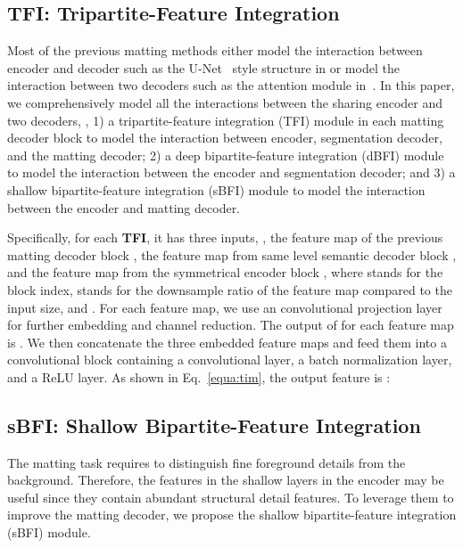 \documentclass[sigconf]{acmart}
\begin{document}
\subsection{TFI: Tripartite-Feature Integration}
\label{sec:tim}
Most of the previous matting methods either model the interaction between encoder and decoder such as the U-Net~\cite{unet} style structure in \cite{gfm} or model the interaction between two decoders such as the attention module in~\cite{hatt}. In this paper, we comprehensively model all the interactions between the sharing encoder and two decoders, , 1) a tripartite-feature integration (TFI) module in each matting decoder block to model the interaction between encoder, segmentation decoder, and the matting decoder; 2) a deep bipartite-feature integration (dBFI) module to model the interaction between the encoder and segmentation decoder; and 3) a shallow bipartite-feature integration (sBFI) module to model the interaction between the encoder and matting decoder.

Specifically, for each \textbf{TFI}, it has three inputs, , the feature map of the previous matting decoder block , the feature map from same level semantic decoder block , and the feature map from the symmetrical encoder block , where  stands for the block index,  stands for the downsample ratio of the feature map compared to the input size, and . For each feature map, we use an  convolutional projection layer  for further embedding and channel reduction. The output of  for each feature map is . We then concatenate the three embedded feature maps and feed them into a convolutional block  containing a
 convolutional layer, a batch normalization layer, and a ReLU layer. As shown in Eq.~\ref{equa:tim}, the output feature is :


\subsection{sBFI: Shallow Bipartite-Feature Integration}
The matting task requires to distinguish fine foreground details from the background. Therefore, the features in the shallow layers in the encoder may be useful since they contain abundant structural detail features. To leverage them to improve the matting decoder, we propose the shallow bipartite-feature integration (sBFI) module.
\end{document}
